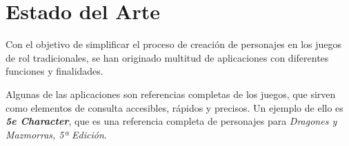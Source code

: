 

\section{Estado del Arte}
Con el objetivo de simplificar el proceso de creación de personajes en los juegos de rol tradicionales, se han originado 
multitud de aplicaciones con diferentes funciones y finalidades. \medskip

Algunas de las aplicaciones son referencias completas de los juegos, que sirven como elementos de consulta accesibles, 
rápidos y precisos. Un ejemplo de ello es \textit{\textbf{5e Character}}, que es una referencia completa de personajes 
para \textit{Dragones y Mazmorras, 5ª Edición}.\bigskip

